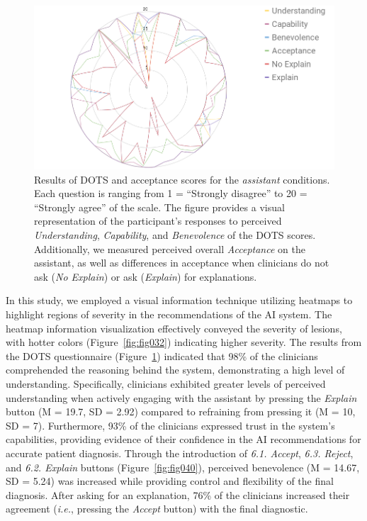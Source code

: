 \begin{figure}[htbp]
\centering
\includegraphics[width=\columnwidth]{images/fig111}
\caption{Results of DOTS and acceptance scores for the {\it assistant} conditions. Each question is ranging from 1 = ``Strongly disagree'' to 20 = ``Strongly agree'' of the scale. The figure provides a visual representation of the participant's responses to perceived {\it Understanding}, {\it Capability}, and {\it Benevolence} of the DOTS scores. Additionally, we measured perceived overall {\it Acceptance} on the assistant, as well as differences in acceptance when clinicians do not ask ({\it No Explain}) or ask ({\it Explain}) for explanations.}
\label{fig:fig111}
\end{figure}

In this study, we employed a visual information technique utilizing heatmaps to highlight regions of severity in the recommendations of the \ac{AI} system.
The heatmap information visualization effectively conveyed the severity of lesions, with hotter colors (Figure~\ref{fig:fig032}) indicating higher severity.
The results from the \ac{DOTS} questionnaire (Figure~\ref{fig:fig111}) indicated that 98\% of the clinicians comprehended the reasoning behind the system, demonstrating a high level of understanding.
Specifically, clinicians exhibited greater levels of perceived understanding when actively engaging with the assistant by pressing the {\it Explain} button (M = 19.7, SD = 2.92) compared to refraining from pressing it (M = 10, SD = 7).
Furthermore, 93\% of the clinicians expressed trust in the system's capabilities, providing evidence of their confidence in the \ac{AI} recommendations for accurate patient diagnosis.
Through the introduction of {\it 6.1. Accept}, {\it 6.3. Reject}, and {\it 6.2. Explain} buttons (Figure~\ref{fig:fig040}), perceived benevolence (M = 14.67, SD = 5.24) was increased while providing control and flexibility of the final diagnosis.
After asking for an explanation, 76\% of the clinicians increased their agreement ({\it i.e.}, pressing the {\it Accept} button) with the final diagnostic.

